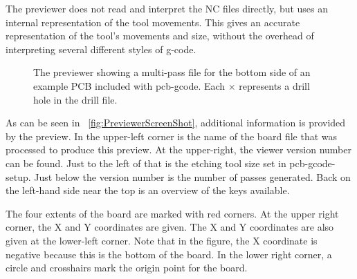 \documentclass[11pt]{book}
\begin{document}
The previewer does not read and interpret the NC files directly, but uses an internal representation of the tool movements. This gives an accurate representation of the tool's movements and size, without the overhead of interpreting several different styles of g-code.

\begin{figure}
	\caption{The previewer showing a multi-pass file for the bottom side of an example PCB included with pcb-gcode. Each $\times$ represents a drill hole in the drill file.}
	\label{fig:PreviewerScreenShot}
\end{figure}

As can be seen in \figurename~\vref{fig:PreviewerScreenShot}, additional information is provided by the preview. In the upper-left corner is the name of the board file that was processed to produce this preview. At the upper-right, the viewer version number can be found. Just to the left of that is the etching tool size set in pcb-gcode-setup. Just below the version number is the number of passes generated. Back on the left-hand side near the top is an overview of the keys available.

The four extents of the board are marked with red corners. At the upper right corner, the X and Y coordinates are given. The X and Y coordinates are also given at the lower-left corner. Note that in the figure, the X coordinate is negative because this is the bottom of the board. In the lower right corner, a circle and crosshairs mark the origin point for the board.
\end{document}
